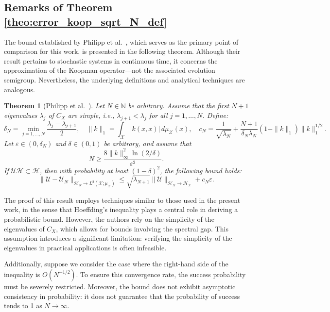 \documentclass{article}
\newtheorem*{theo*}{Theorem}
\renewcommand{\H}{\mathcal{H}}
\newcommand{\U}{\mathcal{U}}
\newcommand{\X}{\mathcal{X}}
\begin{document}
\subsection{Remarks of Theorem \ref{theo:error_koop_sqrt_N_def}}

The bound established by Philipp et al.~\cite{Philipp2024ErrorOperator}, which serves as the primary point of comparison for this work, is presented in the following theorem. Although their result pertains to stochastic systems in continuous time, it concerns the approximation of the Koopman operator---not the associated evolution semigroup. Nevertheless, the underlying definitions and analytical techniques are analogous.

\begin{theo*}[Philipp et al.~\cite{Philipp2024ErrorOperator}] \label{teo:error_koop}
    Let \( N \in \mathbb{N} \) be arbitrary. Assume that the first \( N + 1 \) eigenvalues \( \lambda_j \) of \( C_X \) are simple, i.e., \( \lambda_{j+1} < \lambda_j \) for all \( j = 1, \ldots, N \). Define:
    \[
    \delta_N = \min_{j=1, \ldots, N} \frac{\lambda_j - \lambda_{j+1}}{2}, \quad \| k \|_1 = \int_{\X}  |k(x,x)| \, d\mu_\X (x), \quad c_N = \frac{1}{\sqrt{\lambda_N}} + \frac{N + 1}{\delta_N \lambda_N} (1 + \|k\|_{1}) \|k \|^{1/2}_{1}.
    \]
    Let \( \varepsilon \in (0, \delta_N) \) and \( \delta \in (0, 1) \) be arbitrary, and assume that
    \[
    N \geq  \frac{8\|k\|^2_\infty \ln(2/\delta)}{\varepsilon^2}.
    \]
    If \( \U \H \subset \H \), then with probability at least \( (1 - \delta)^2 \), the following bound holds:
    \[
    \|\U - \U_N \|_{\H_N \to L^2(\X; \mu_\X)} \leq \sqrt{\lambda_{N+1}} \|\U \|_{\H_{X} \to \mathcal{H}_\X} + c_N \varepsilon.
    \]
\end{theo*}

The proof of this result employs techniques similar to those used in the present work, in the sense that Hoeffding's inequality plays a central role in deriving a probabilistic bound. However, the authors rely on the simplicity of the eigenvalues of \( C_X \), which allows for bounds involving the spectral gap. This assumption introduces a significant limitation: verifying the simplicity of the eigenvalues in practical applications is often infeasible.

Additionally, suppose we consider the case where the right-hand side of the inequality is \( O(N^{-1/2}) \). To ensure this convergence rate, the success probability must be severely restricted. Moreover, the bound does not exhibit asymptotic consistency in probability: it does not guarantee that the probability of success tends to 1 as \( N \to \infty \).
\end{document}
